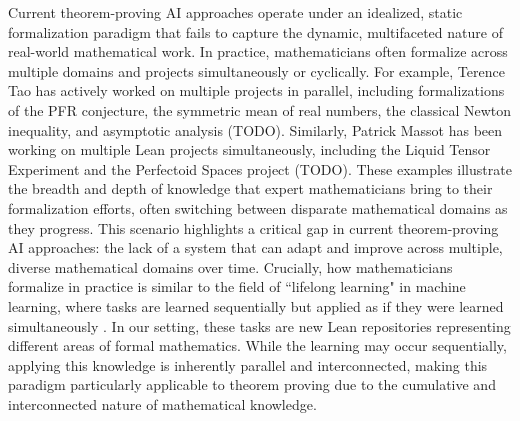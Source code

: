 \documentclass{article} %
\begin{document}
Current theorem-proving AI approaches operate under an idealized, static formalization paradigm that fails to capture the dynamic, multifaceted nature of real-world mathematical work. In practice, mathematicians often formalize across multiple domains and projects simultaneously or cyclically. For example, Terence Tao has actively worked on multiple projects in parallel, including formalizations of the PFR conjecture, the symmetric mean of real numbers, the classical Newton inequality, and asymptotic analysis (TODO). Similarly, Patrick Massot has been working on multiple Lean projects simultaneously, including the Liquid Tensor Experiment and the Perfectoid Spaces project (TODO). These examples illustrate the breadth and depth of knowledge that expert mathematicians bring to their formalization efforts, often switching between disparate mathematical domains as they progress. This scenario highlights a critical gap in current theorem-proving AI approaches: the lack of a system that can adapt and improve across multiple, diverse mathematical domains over time. Crucially, how mathematicians formalize in practice is similar to the field of ``lifelong learning" in machine learning, where tasks are learned sequentially but applied as if they were learned simultaneously \citep{wangComprehensiveSurveyContinual2024}. In our setting, these tasks are new Lean repositories representing different areas of formal mathematics. While the learning may occur sequentially, applying this knowledge is inherently parallel and interconnected, making this paradigm particularly applicable to theorem proving due to the cumulative and interconnected nature of mathematical knowledge.
\end{document}
